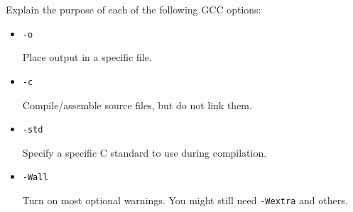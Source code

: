 Explain the purpose of each of the following GCC options:
\begin{itemize}
	\item \texttt{-o}	\hspace{20mm}
		\begin{answer}
		Place output in a specific file.
		\end{answer}
	\item \texttt{-c}	\hspace{20mm}
		\begin{answer}
		Compile/assemble source files, but do not link them.
		\end{answer}
	\item \texttt{-std}	\hspace{17mm}
		\begin{answer}
		Specify a specific C standard to use during compilation.
		\end{answer}
	\item \texttt{-Wall}	\hspace{14mm}
		\begin{answer}
		Turn on most optional warnings. You might still need \texttt{-Wextra} and others.
		\end{answer}
	
\end{itemize}
